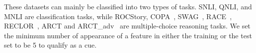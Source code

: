 These datasets can mainly be classified into two types of tasks. 
SNLI, QNLI, and MNLI are classification tasks, while 
ROCStory, COPA~\cite{roemmele2011choice}, SWAG~\cite{zellers2018swag}, 
RACE~\cite{lai2017race}, 
RECLOR~\cite{yu2020reclor}, %
ARCT and ARCT\_adv~\cite{schuster2019towards} are
multiple-choice reasoning tasks. 
We set the minimum number of appearance of a feature
in either the training or the test set to be 5 to qualify as a cue.

%
%
%
%
%
